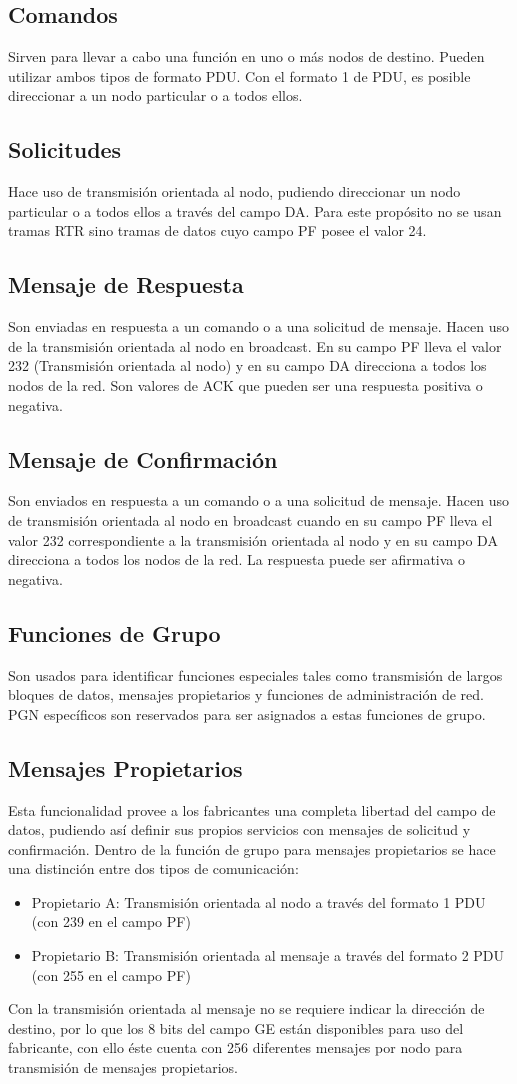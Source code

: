 \subsection{Comandos}
Sirven para llevar a cabo una función en uno o más nodos de destino. Pueden utilizar ambos tipos de formato PDU. Con el formato 1 de PDU, es posible direccionar a un nodo particular o a todos ellos. 
\subsection{Solicitudes}
Hace uso de transmisión orientada al nodo, pudiendo direccionar un nodo particular o a todos ellos a través del campo DA. Para este propósito no se usan tramas RTR sino tramas de datos cuyo campo PF posee el valor 24.
\subsection{Mensaje de Respuesta}
Son enviadas en respuesta a un comando o a una solicitud de mensaje. Hacen uso de la transmisión orientada al nodo en broadcast. En su campo PF lleva el valor 232 (Transmisión orientada al nodo) y en su campo DA direcciona a todos los nodos de la red. Son valores de ACK que pueden ser una respuesta positiva o negativa.
\subsection{Mensaje de Confirmación}
Son enviados en respuesta a un comando o a una solicitud de mensaje. Hacen uso de transmisión orientada al nodo en broadcast cuando en su campo PF lleva el valor 232 correspondiente a la transmisión orientada al nodo y en su campo DA direcciona a todos los nodos de la red. La respuesta puede ser afirmativa o negativa.
\subsection{Funciones de Grupo}
Son usados para identificar funciones especiales tales como transmisión de largos bloques de datos, mensajes propietarios y funciones de administración de red. PGN específicos son reservados para ser asignados a estas funciones de grupo.
\subsection{Mensajes Propietarios}
Esta funcionalidad provee a los fabricantes una completa libertad del campo de datos, pudiendo así definir sus propios servicios con mensajes de solicitud y confirmación. Dentro de la función de grupo para mensajes propietarios se hace una distinción entre dos tipos de comunicación:
\begin{itemize}
\item Propietario A: Transmisión orientada al nodo a través del formato 1 PDU (con 239 en el campo PF)
\item Propietario B: Transmisión orientada al mensaje a través del formato 2 PDU (con 255 en el campo PF)
\end{itemize}
Con la transmisión orientada al mensaje no se requiere indicar la dirección de destino, por lo que los 8 bits del campo GE están disponibles para uso del fabricante, con ello éste cuenta con 256 diferentes mensajes por nodo para transmisión de mensajes propietarios.
